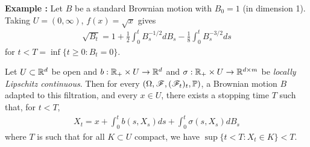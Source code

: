 \documentclass[10pt,a4paper]{article}
\begin{document}
\textbf{Example :} Let $B$ be a standard Brownian motion with $B_0 =1$ (in dimension 1). Taking $U=(0, \infty)$, $f(x) = \sqrt{x}$ gives
\begin{align*}
\sqrt{B_t} = 1+\frac{1}{2} \int_0^t B_s^{-1/2}dB_s - \frac{1}{8} \int_0^t B_s^{-3/2} ds
\end{align*}
for $t< T= \inf\{t\geq 0: B_t = 0 \}$.
\s

\thm Let $U\subset \mathbb{R}^d$ be open and $b: \mathbb{R}_+ \times U \rightarrow \mathbb{R}^d$ and $\sigma : \mathbb{R}_+ \times U \rightarrow \mathbb{R}^{d\times m}$ be \emph{locally Lipschitz continuous}. Then for every $(\Omega, \mathscr{F}, (\mathscr{F}_t)_t, \mathbb{P})$, a Brownian motion $B$ adapted to this filtration, and every $x\in U$, there exists a stopping time $T$ such that, for $t< T$,
\begin{align*}
X_t = x+ \int_0^t b(s, X_s) ds + \int_0^t \sigma(s, X_s) dB_s
\end{align*}
where $T$ is such that for all $K\subset U$ compact, we have $\sup\{t< T : X_t \in K \} < T$. 
\end{document}
